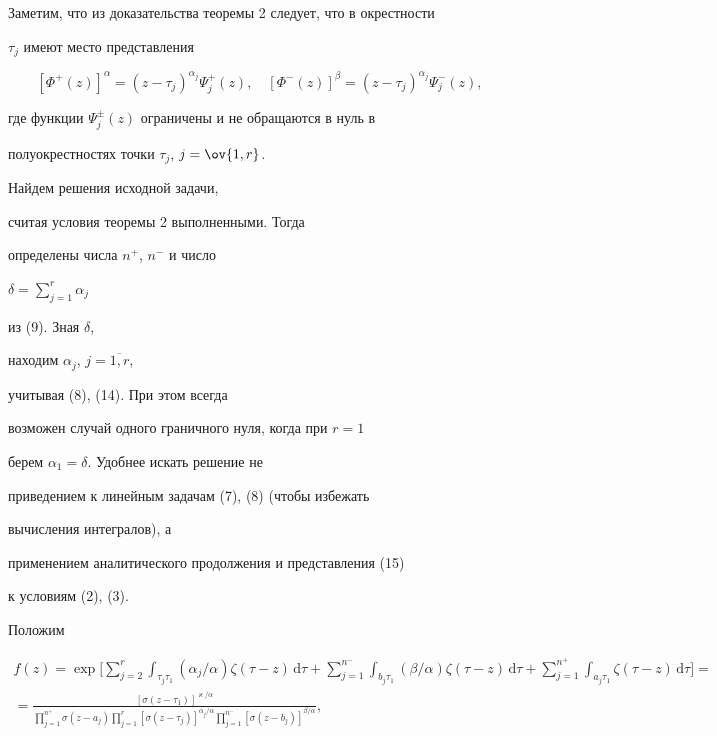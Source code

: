 Заметим, что из доказательства теоремы 2 следует, что в окрестности


$\tau_j$ имеют место представления


\begin{equation}


[\Phi^{+}(z)]^{\alpha}=(z-\tau_j)^{\alpha_{j}}\Psi^{+}_{j}(z),


\quad [\Phi^{-}(z)]^{\beta}=(z-\tau_j)^{\alpha_{j}}\Psi^{-}_{j}(z),


\end{equation}


где функции $\Psi^{\pm}_{j}(z)$ ограничены и не обращаются в нуль в


полуокрестностях точки $\tau_j$, $j=\ov{1,r}$.





Найдем решения исходной задачи,


считая условия теоремы 2 выполненными. Тогда


определены числа $n^+$, $n^-$ и число


$\delta = \sum\limits_{j=1}^{r}\alpha_{j}$


из (9). Зная $\delta$,


находим $\alpha_j$, $j=\overline{1,r}$,


учитывая (8), (14). При этом всегда


возможен случай одного граничного нуля, когда при $r=1$


берем $\alpha_1=\delta$. Удобнее искать решение не


приведением к линейным задачам (7), (8) (чтобы избежать


вычисления интегралов), а


применением аналитического продолжения и представления (15)


к условиям (2), (3).





Положим


\begin{multline*}


f(z)=\exp \bigg[


\sum_{j=2}^{r}\int_{\tau_{j}\tau_{1}}(\alpha_{j}/\alpha)


\zeta(\tau-z)\,\mathrm d\tau


+ \sum_{j=1}^{n^-}\int_{b_{j}\tau_{1}}(\beta/\alpha)


\zeta(\tau-z)\,\mathrm d\tau + 


\sum_{j=1}^{n^+}\int_{a_{j}\tau_{1}}\zeta(\tau-z)\,\mathrm d\tau


\bigg]= \\


%


=\frac{[\sigma(z-\tau_1)]^{\varkappa/\alpha}}


{\prod\limits_{j=1}^{n^{+}}\sigma (z-a_{j})


\prod\limits_{j=1}^{r}[\sigma (z-\tau_{j})]^{\alpha_{j}/\alpha}


\prod\limits_{j=1}^{n^{-}}[\sigma(z-b_{j})]^{\beta/\alpha}},


\end{multline*}


